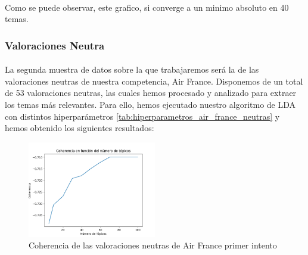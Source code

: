 \documentclass{report}
\begin{document}
{{                    \paragraph*{}{
                        Como se puede observar, este grafico, si converge a un minimo absoluto en 40 temas.
                    }
                \clearpage\subsubsection*{Valoraciones Neutra}
                    \paragraph*{}{
                        La segunda muestra de datos sobre la que trabajaremos será la de las valoraciones neutras de nuestra competencia, Air France.
                        Disponemos de un total de 53 valoraciones neutras, las cuales hemos procesado y analizado para extraer los temas más relevantes.
                        Para ello, hemos ejecutado nuestro algoritmo de LDA con distintos hiperparámetros \ref{tab:hiperparametros_air_france_neutras} y hemos obtenido los siguientes resultados:
                    }
                    \begin{figure}[H]
                        \centering
                        \includegraphics[width=0.5\textwidth]{./img/air_france_neutras1.png}
                        \caption{Coherencia de las valoraciones neutras de Air France primer intento}
                    \end{figure}
}}
\end{document}
